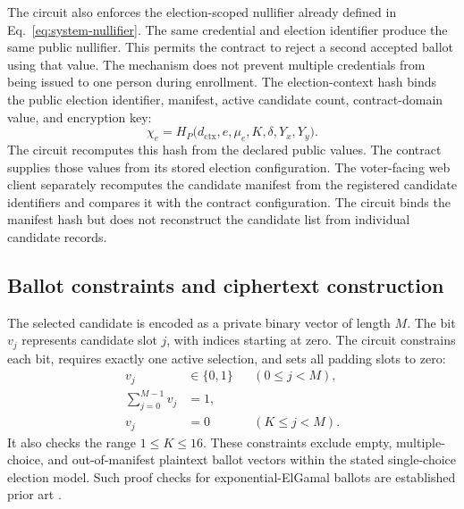 The circuit also enforces the election-scoped nullifier already defined in
Eq.~\eqref{eq:system-nullifier}. The same credential and election identifier
produce the same public nullifier. This permits the contract to reject a
second accepted ballot using that value. The mechanism does not prevent
multiple credentials from being issued to one person during enrollment.
The election-context hash binds the public election identifier, manifest,
active candidate count, contract-domain value, and encryption key:
\begin{equation}
\label{eq:protocol-context}
\chi_e=H_P\bigl(
 d_{\mathrm{ctx}},e,\mu_e,K,\delta,Y_x,Y_y
\bigr).
\end{equation}
The circuit recomputes this hash from the declared public values. The
contract supplies those values from its stored election configuration.
The voter-facing web client separately recomputes the candidate manifest
from the registered candidate identifiers and compares it with the
contract configuration. The circuit binds the manifest hash but does not
reconstruct the candidate list from individual candidate records.


\subsection{Ballot constraints and ciphertext construction}
\label{subsec:protocol-encryption}

The selected candidate is encoded as a private binary vector of length $M$.
The bit $v_j$ represents candidate slot $j$, with indices starting at zero.
The circuit constrains each bit, requires exactly one active selection, and
sets all padding slots to zero:
\begin{equation}
\label{eq:protocol-onehot}
\begin{aligned}
 v_j&\in\{0,1\} && (0\leq j<M),\\
 \sum_{j=0}^{M-1}v_j&=1,\\
 v_j&=0 && (K\leq j<M).
\end{aligned}
\end{equation}
It also checks the range $1\leq K\leq16$. These constraints exclude
empty, multiple-choice, and out-of-manifest plaintext ballot vectors
within the stated single-choice election model. Such proof checks for
exponential-ElGamal ballots are established prior art
\citep{huber2025ballotvalidity}.

